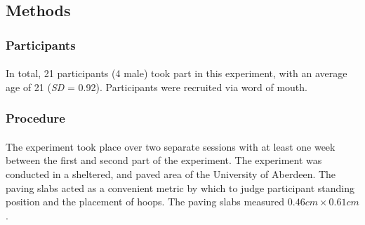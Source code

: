 \documentclass[12pt]{article}
\begin{document}
 
 
\subsection*{Methods}
\subsubsection*{Participants}
\paragraph{} In total, 21 participants (4 male) took part in this experiment, with an average age of 21 (\textit{SD} = 0.92). Participants were recruited via word of mouth.

\subsubsection*{Procedure}
\paragraph{} The experiment took place over two separate sessions with at least one week between the first and second part of the experiment. The experiment was conducted in a sheltered, and paved area of the University of Aberdeen. The paving slabs acted as a convenient metric by which to judge participant standing position and the placement of hoops. The paving slabs measured $0.46cm \times 0.61cm$.
\end{document}
